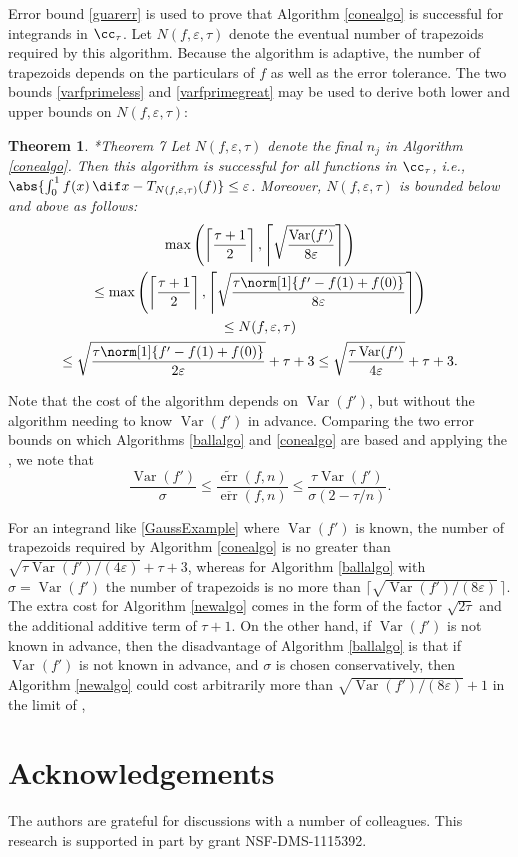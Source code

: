 \documentclass[]{article}
\DeclareMathOperator{\Var}{Var}
\DeclareMathOperator{\err}{err}
\newcommand{\oerr}{\overline{\err}}
\newcommand{\terr}{\widetilde{\err}}
\newtheorem{theorem}{Theorem}
\theoremstyle{definition}
\theoremstyle{remark}
\begin{document}
Error bound \eqref{guarerr} is used to prove that Algorithm \ref{conealgo} is successful for integrands in $\cc_{\tau}$.  Let $N(f,\varepsilon,\tau)$ denote the eventual number of trapezoids required by this algorithm.  Because the algorithm is adaptive, the number of trapezoids depends on the particulars of $f$ as well as the error tolerance.  The two bounds \eqref{varfprimeless} and \eqref{varfprimegreat} may be used to derive both lower and upper bounds on $N(f,\varepsilon,\tau)$:

\begin{theorem}\cite{HicEtal14b}*{Theorem 7} \label{conealgothm}
Let $N(f,\varepsilon,\tau)$ denote the final $n_j$ in Algorithm \ref{conealgo}.  Then this algorithm is successful for all functions in $\cc_{\tau}$,  i.e.,  $\abs{\int_0^1 f(x) \, \dif x - T_{N(f,\varepsilon,\tau)}(f)} \le \varepsilon$.  Moreover, $N(f,\varepsilon,\tau)$ is bounded below and above as follows:
\begin{multline}
\max \left(\left \lceil\frac{\tau+1}{2} \right \rceil, \left \lceil \sqrt{\frac{ \Var(f')}{8\varepsilon}} \right \rceil \right) \\
\le \max \left(\left \lceil\frac{\tau+1}{2} \right \rceil, \left \lceil \sqrt{\frac{\tau \norm[1]{f'-f(1)+f(0)}}{8\varepsilon}} \right \rceil \right) \\
\le
N(f,\varepsilon,\tau) \\
\le \sqrt{\frac{\tau \norm[1]{f'-f(1)+f(0)}}{2\varepsilon}} + \tau + 3
\le \sqrt{\frac{\tau \Var(f') }{4\varepsilon}} + \tau + 3.
\end{multline}
\end{theorem}

Note that the cost of the algorithm depends on $\Var(f')$, but without the algorithm needing to know $\Var(f')$ in advance.   Comparing the two error bounds on which Algorithms \ref{ballalgo} and \ref{conealgo} are based and applying the , we note that 
\begin{equation*}
\frac{\Var(f')}{\sigma} \le
\frac{\terr(f,n)}{\oerr(f,n)}
\le \frac{\tau\Var(f')}{\sigma (2-\tau/n)}.
\end{equation*}



For an integrand like \eqref{GaussExample} where $\Var(f')$ is known, the number of trapezoids required by Algorithm \ref{conealgo} is no greater than  $\sqrt{\tau \Var(f') /(4\varepsilon)} + \tau + 3$, whereas for Algorithm \ref{ballalgo} with $\sigma=\Var(f')$ the number of trapezoids is no more than $\bigl \lceil \sqrt{\Var(f') /(8\varepsilon)} \, \bigr\rceil$.  The extra cost for Algorithm \ref{newalgo} comes in the form of the factor $\sqrt{2\tau}$ and the additional additive term of $\tau+1$.  On the other hand, if $\Var(f')$ is not known in advance, then the disadvantage of Algorithm  \ref{ballalgo} is that if $\Var(f')$ is not known in advance, and $\sigma$ is chosen conservatively, then Algorithm \ref{newalgo} could cost arbitrarily more than $\sqrt{\Var(f') /(8\varepsilon)}+1$ in the limit of , 

\section{Acknowledgements}  The authors are grateful for discussions with a number of colleagues. This research is supported in part by grant NSF-DMS-1115392.


\end{document}

